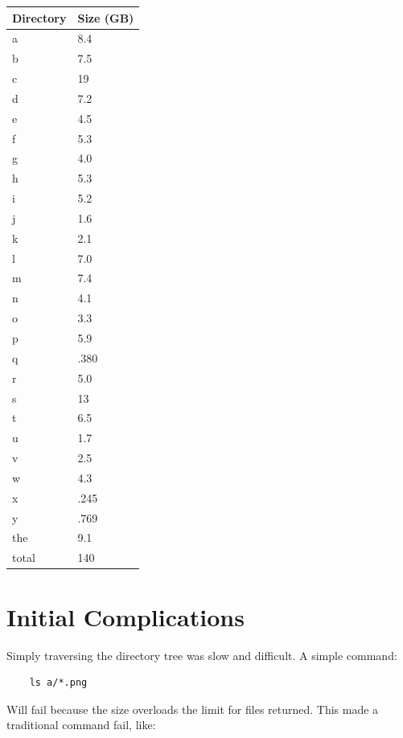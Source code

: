 \documentclass[11pt,a4paper,titlepage]{article}
\begin{document}
\begin{minipage}{\linewidth}
\centering
\begin{tabular}{|l|l|}
\hline
Directory & Size (GB) \\ \hline
a   & 8.4 \\ \hline
b   & 7.5 \\ \hline
c   & 19 \\ \hline
d   & 7.2 \\ \hline
e   & 4.5 \\ \hline
f   & 5.3 \\ \hline
g   & 4.0 \\ \hline
h   & 5.3 \\ \hline
i   & 5.2 \\ \hline
j   & 1.6 \\ \hline
k   & 2.1 \\ \hline
l   & 7.0 \\ \hline
m   & 7.4 \\ \hline
n   & 4.1 \\ \hline
o   & 3.3 \\ \hline
p   & 5.9 \\ \hline
q   & .380 \\ \hline
r   & 5.0 \\ \hline
s   & 13 \\ \hline
t   & 6.5 \\ \hline
u   & 1.7 \\ \hline
v   & 2.5 \\ \hline
w   & 4.3 \\ \hline
x   & .245 \\ \hline
y   & .769 \\ \hline
the & 9.1 \\ \hline
total & 140  \\ \hline
\end{tabular}
\end{minipage}

\section{Initial Complications}

Simply traversing the directory tree was slow and difficult.  A simple command:

\begin{lstlisting}
    ls a/*.png
\end{lstlisting}

Will fail because the size overloads the limit for files returned.  This made a
traditional command fail, like:
\end{document}
